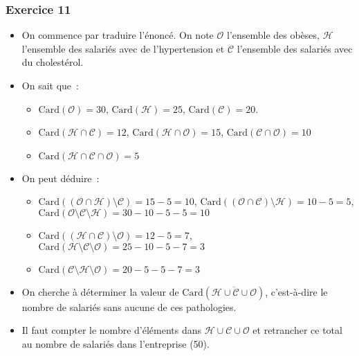 \documentclass[10pt,notheorems]{beamer}
\theoremstyle{plain}
\theoremstyle{definition} %
\begin{document}
\begin{frame}
  \frametitle{Exercice 11}
  \fontsize{8}{10}\selectfont

  \begin{itemize}
  \item On commence par traduire l'énoncé. On note $\mathcal O$ l'ensemble des obèses, $\mathcal H$ l'ensemble des salariés avec de l'hypertension et $\mathcal C$ l'ensemble des salariés avec du cholestérol.\newline
  \item On sait que~:
    \begin{itemize}
    \item $\mathrm{Card}(\mathcal O) = 30$, $\mathrm{Card}(\mathcal H) = 25$, $\mathrm{Card}(\mathcal C) = 20$.
    \item $\mathrm{Card}(\mathcal H \cap \mathcal C) = 12$, $\mathrm{Card}(\mathcal H \cap \mathcal O) = 15$, $\mathrm{Card}(\mathcal C \cap \mathcal O) = 10$
    \item $\mathrm{Card}(\mathcal H \cap \mathcal C \cap \mathcal O) = 5$\newline
    \end{itemize}
  \item On peut déduire~:
    \begin{itemize}
    \item $\mathrm{Card}((\mathcal O \cap \mathcal H)\setminus\mathcal C) = 15-5 = 10$, $\mathrm{Card}((\mathcal O \cap \mathcal C)\setminus\mathcal H) = 10-5 = 5$, $\mathrm{Card}(\mathcal O \setminus\mathcal C \setminus\mathcal H) = 30-10-5-5 = 10$
    \item $\mathrm{Card}((\mathcal H \cap \mathcal C)\setminus\mathcal O) = 12-5 = 7$, $\mathrm{Card}(\mathcal H \setminus\mathcal C \setminus \mathcal O) = 25-10-5-7 = 3$
    \item $\mathrm{Card}(\mathcal C \setminus\mathcal H \setminus \mathcal O) = 20-5-5-7 = 3$\newline
    \end{itemize}
  \item On cherche à déterminer la valeur de $\mathrm{Card}(\overline{\mathcal H \cup \mathcal C \cup \mathcal O})$, c'est-à-dire le nombre de salariés sans aucune de ces pathologies.\newline
  \item Il faut compter le nombre d'éléments dans $\mathcal H \cup \mathcal C \cup \mathcal O$ et retrancher ce total au nombre de salariés dans l'entreprise (50).\newline
  \end{itemize}

\end{frame}
\end{document}
